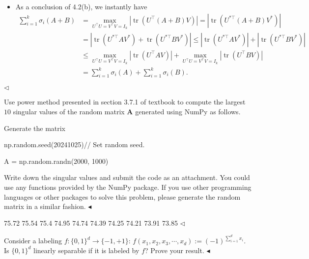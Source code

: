 \documentclass[11pt]{article}
\newenvironment{problem}[2][Problem]{\begin{trivlist}
\item[\hskip \labelsep {\bfseries #1}\hskip \labelsep {\bfseries #2.}]}{\hfill$\blacktriangleleft$\end{trivlist}}
\newenvironment{answer}[1][Answer]{\begin{trivlist}
\item[\hskip \labelsep {\bfseries #1.}\hskip \labelsep]}{\hfill$\lhd$\end{trivlist}}
\begin{document}
\begin{answer}
\begin{itemize}
\begin{itemize}
\item [(b)]
 As a conclusion of 4.2(b), we instantly have
 $$
\begin{aligned}
 \sum_{i=1}^k \sigma_i(A+B)&=\max _{U^{\top} U=V^{\top} V=I_k}\left|\operatorname{tr}\left(U^{\top}(A+B) V\right)\right|=\left|\operatorname{tr}\left(U^{* \top}(A+B) V^*\right)\right|\\&=\left|\operatorname{tr}\left(U^{* \top} A V^*\right)+\operatorname{tr}\left(U^{* \top} B V^*\right)\right| 
 \leq\left|\operatorname{tr}\left(U^{* \top} AV^*\right)\right|+\left|\operatorname{tr}\left(U^{* \top} B V^*\right)\right|\\& \leq \max _{U^{\top} U=V^{\top} V=I_k}\left|\operatorname{tr}\left(U^{\top} A V\right)\right|+\max _{U^{\top} U=V^{\top} V=I_k}\left|\operatorname{tr}\left(U^{\top} B V\right)\right| \\
& =\sum_{i=1}^k \sigma_i(A)+\sum_{i=1}^k \sigma_i(B) .
\end{aligned}
$$
    \end{itemize} 
\end{itemize}
\end{answer}


\begin{problem}{5 (5')}
Use power method presented in section 3.7.1 of textbook to compute the largest $10$ singular values of the random matrix $\bm A$ generated using NumPy as follows.

\begin{algorithm}[htbp]
    \caption{Generate the matrix}
    np.random.seed(20241025)\qquad  // Set random seed.

    A = np.random.randn(2000, 1000)
\end{algorithm}

Write down the singular values and submit the code as an attachment. You could use any functions provided by the NumPy package. If you use other programming languages or other packages to solve this problem, please generate the random matrix in a similar fashion.
\end{problem}
\begin{answer}
    75.72 75.54 75.4  74.95 74.74 74.39 74.25 74.21 73.91 73.85
\end{answer}

\begin{problem}{6 (5')}
Consider a labeling $f:\{0,1\}^d\to \{-1,+1\}$: $f(x_1,x_2,x_3,\cdots,x_d):=(-1)^{\sum_{i=1}^d x_i}$. Is $\{0,1\}^d$ linearly separable if it is labeled by $f$? Prove your result.
\end{problem}
\end{document}
